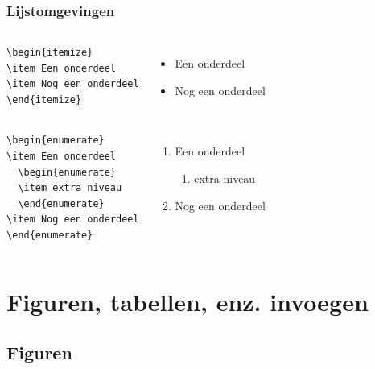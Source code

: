 \documentclass{beamer}
\begin{document}
\begin{frame}[fragile]
  \frametitle{Lijstomgevingen}
  
  \begin{columns}[c]
\begin{verbatim}  
\begin{itemize}
\item Een onderdeel
\item Nog een onderdeel
\end{itemize}
\end{verbatim}

\begin{itemize}
\item Een onderdeel
\item Nog een onderdeel
\end{itemize}
  \end{columns}

\pause

  \begin{columns}[c]
\begin{verbatim}  
\begin{enumerate}
\item Een onderdeel
  \begin{enumerate}
  \item extra niveau
  \end{enumerate}
\item Nog een onderdeel
\end{enumerate}
\end{verbatim}

\begin{enumerate}
\item Een onderdeel
  \begin{enumerate}
  \item extra niveau
  \end{enumerate}
\item Nog een onderdeel
\end{enumerate}
  \end{columns}

\end{frame}

\section{Figuren, tabellen, enz. invoegen}

\subsection{Figuren}
\end{document}
